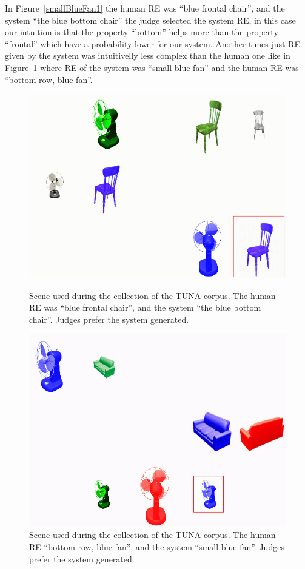 In Figure~\ref{smallBlueFan1} the human RE was ``blue frontal chair'', and the system ``the blue bottom chair'' the judge selected the system RE, in this case our intuition is that the property ``bottom'' helps more than the property ``frontal'' which have a probability lower for our system. Another times just RE given by the system was intuitivelly less complex than the human one like in Figure~\ref{smallBlueFan} where RE of the system was ``small blue fan'' and the human RE was ``bottom row, blue fan''.
\begin{figure}[ht]
\begin{minipage}{0.50\linewidth}
\centering
\includegraphics[width=\textwidth]{images/tuna.jpg} %
\caption{Scene used during the collection of the TUNA corpus. The human RE was ``blue frontal chair'', and the system ``the blue bottom chair''. Judges prefer the system generated.}
\label{smallBlueFan1}
\end{minipage}
\begin{minipage}{0.50\linewidth}
\centering
\includegraphics[width=\textwidth]{images/smallBlueFan.jpg}
\caption{Scene used during the collection of the TUNA corpus. The human RE ``bottom row, blue fan'', and the system ``small blue fan''. Judges prefer the system generated.}
\label{smallBlueFan}
\end{minipage}
\end{figure}


